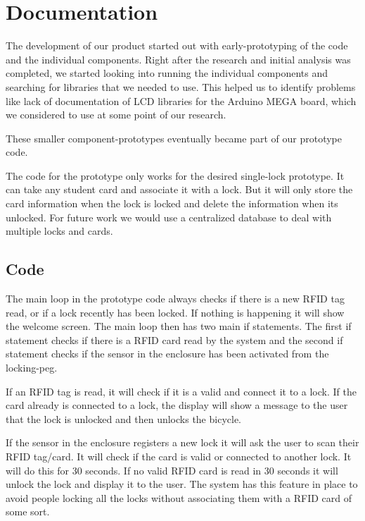 \section{Documentation}

The development of our product started out with early-prototyping of the code and the individual components. Right after the research and initial analysis was completed, we started looking into running the individual components and searching for libraries that we needed to use. This helped us to identify problems like lack of documentation of LCD libraries for the Arduino MEGA board, which we considered to use at some point of our research. 


These smaller component-prototypes eventually became part of our prototype code.


The code for the prototype only works for the desired single-lock prototype. It can take any student card and associate it with a lock. But it will only store the card information when the lock is locked and delete the information when its unlocked. For future work we would use a centralized database to deal with multiple locks and cards.

\subsection{Code}

	


The main loop in the prototype code always checks if there is a new RFID tag read, or if a lock recently has been locked. If nothing is happening it will show the welcome screen. The main loop then has two main if statements. The first if statement checks if there is a RFID card read by the system and the second if statement checks if the sensor in the enclosure has been activated from the locking-peg.

 
If an RFID tag is read, it will check if it is a valid and connect it to a lock. If the card already is connected to a lock, the display will show a message to the user that the lock is unlocked and then unlocks the bicycle. 


If the sensor in the enclosure registers a new lock it will ask the user to scan their RFID tag/card. It will check if the card is valid or connected to another lock. It will do this for 30 seconds. If no valid RFID card is read in 30 seconds it will unlock the lock and display it to the user. The system has this feature in place to avoid people locking all the locks without associating them with a RFID card of some sort.



